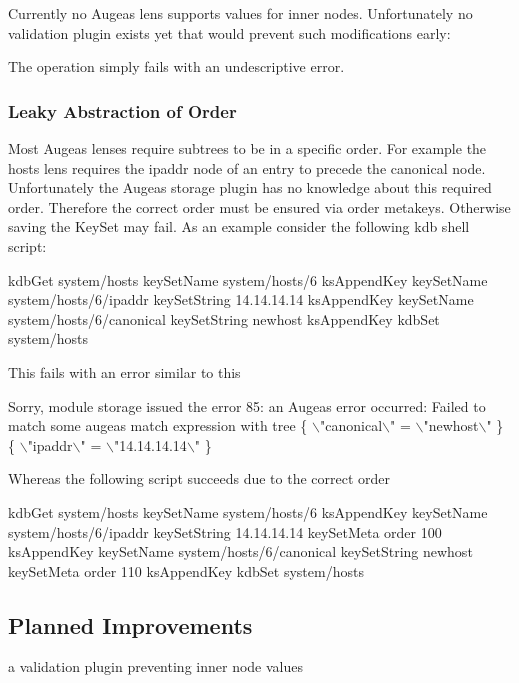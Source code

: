 Currently no Augeas lens supports values for inner nodes. Unfortunately no validation plugin exists yet that would prevent such modifications early\+:




The operation simply fails with an undescriptive error.

\subsubsection*{Leaky Abstraction of Order}

Most Augeas lenses require subtrees to be in a specific order. For example the hosts lens requires the ipaddr node of an entry to precede the canonical node. Unfortunately the Augeas storage plugin has no knowledge about this required order. Therefore the correct order must be ensured via order metakeys. Otherwise saving the Key\+Set may fail. As an example consider the following kdb shell script\+:


\begin{DoxyCode}
kdbGet system/hosts
keySetName system/hosts/6
ksAppendKey
keySetName system/hosts/6/ipaddr
keySetString 14.14.14.14
ksAppendKey
keySetName system/hosts/6/canonical
keySetString newhost
ksAppendKey
kdbSet system/hosts
\end{DoxyCode}


This fails with an error similar to this


\begin{DoxyCode}
Sorry, module storage issued the error 85:
an Augeas error occurred: Failed to match
some augeas match expression
with tree
\{ \(\backslash\)"canonical\(\backslash\)" = \(\backslash\)"newhost\(\backslash\)" \} \{ \(\backslash\)"ipaddr\(\backslash\)" = \(\backslash\)"14.14.14.14\(\backslash\)" \}
\end{DoxyCode}


Whereas the following script succeeds due to the correct order


\begin{DoxyCode}
kdbGet system/hosts
keySetName system/hosts/6
ksAppendKey
keySetName system/hosts/6/ipaddr
keySetString 14.14.14.14
keySetMeta order 100
ksAppendKey
keySetName system/hosts/6/canonical
keySetString newhost
keySetMeta order 110
ksAppendKey
kdbSet system/hosts
\end{DoxyCode}


\subsection*{Planned Improvements}


\begin{DoxyItemize}
\item a validation plugin preventing inner node values 
\end{DoxyItemize}